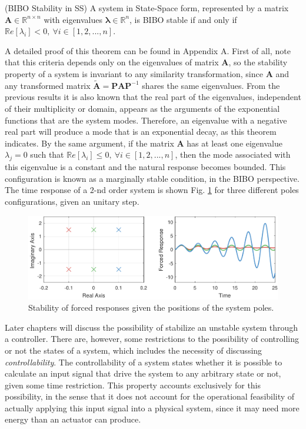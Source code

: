 \documentclass[a4paper,11pt]{book}
\numberwithin{figure}{chapter}
\numberwithin{equation}{chapter}
\numberwithin{table}{chapter}
\newtheorem{theorem}{Theorem}[chapter]
\theoremstyle{definition}
\newcounter{boxed-theorem}
\newenvironment{boxed-theorem}[1]
{\colorlet{shadecolor}{pastelBlue2!10} \begin{shaded} \begin{theorem}{#1}}
{\end{theorem} \end{shaded}}
\newcounter{boxed-definition}
\newcounter{boxed-example}
\begin{document}
\begin{boxed-theorem}{(BIBO Stability in SS)} \label{th:BIBOStab}
    A system in State-Space form, represented by a matrix $\bm{A} \in \mathbb{R}^{n \times n}$ with eigenvalues $\bm{\lambda} \in \mathbb{R}^n$, is BIBO stable if and only if $\mathbb{R}e[\lambda_i] < 0,\ \forall i \in [1,2,...,n]$.
\end{boxed-theorem}

A detailed proof of this theorem can be found in Appendix A. First of all, note that this criteria depends only on the eigenvalues of matrix $\bm{A}$, so the stability property of a system is invariant to any similarity transformation, since $\bm{A}$ and any transformed matrix $\tilde{\bm{A}} = \bm{P} \bm{A} \bm{P}^{-1}$ shares the same eigenvalues. From the previous results it is also known that the real part of the eigenvalues, independent of their multiplicity or domain, appears as the arguments of the exponential functions that are the system modes. Therefore, an eigenvalue with a negative real part will produce a mode that is an exponential decay, as this theorem indicates. By the same argument, if the matrix $\bm{A}$ has at least one eigenvalue $\lambda_j = 0$ such that $\mathbb{R}e[\lambda_i] \leq 0,\ \forall i \in [1,2,...,n]$, then the mode associated with this eigenvalue is a constant and the natural response becomes bounded. This configuration is known as a marginally stable condition, in the BIBO perspective. The time response of a $2$-nd order system is shown Fig. \ref{fig:stability01} for three different poles configurations, given an unitary step.

\begin{figure}[ht]
    \centering
    \includegraphics[width=\textwidth]{chapter2/stability01}
    \caption{Stability of forced responses given the positions of the system poles.}
    \label{fig:stability01}
\end{figure} 

Later chapters will discuss the possibility of stabilize an unstable system through a controller. There are, however, some restrictions to the possibility of controlling or not the states of a system, which includes the necessity of discussing \textit{controllability}. The controllability of a system states whether it is possible to calculate an input signal that drive the system to any arbitrary state or not, given some time restriction. This property accounts exclusively for this possibility, in the sense that it does not account for the operational feasibility of actually applying this input signal into a physical system, since it may need more energy than an actuator can produce. 
\end{document}

